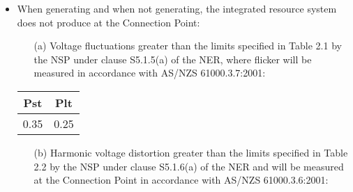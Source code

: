 %
	
	\begin{itemize}
		\item When generating and when not generating, the integrated resource system does not produce at the Connection Point:
		\begin{itemize}
			\item[(a)] Voltage fluctuations greater than the limits specified in Table 2.1 by the NSP under clause S5.1.5(a) of the NER, where flicker will be measured in accordance with AS/NZS 61000.3.7:2001:
		\end{itemize}
		
			\begin{center}
			\begin{tabular}{|c|c|}
				\hline
				\textbf{Pst} & \textbf{Plt} \\
				\hline
				0.35 & 0.25 \\
				\hline
			\end{tabular}
			\end{center}
		
		\begin{itemize}
			\item[(b)] Harmonic voltage distortion greater than the limits specified in Table 2.2 by the NSP under clause S5.1.6(a) of the NER and will be measured at the Connection Point in accordance with AS/NZS 61000.3.6:2001:
		\end{itemize}
		

\end{itemize}
